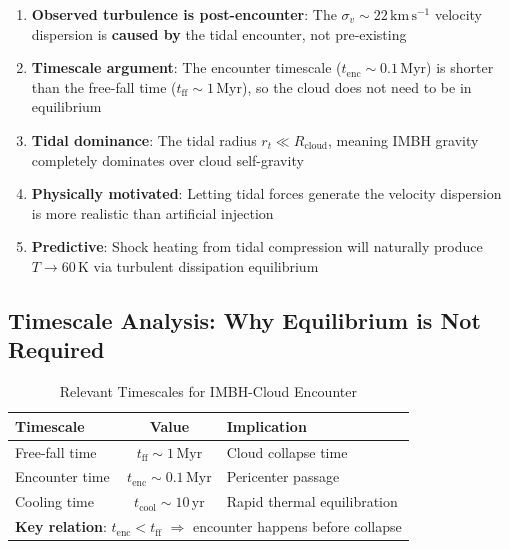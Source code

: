 \documentclass[11pt,a4paper]{article}
\newcommand{\kms}{\,\mathrm{km\,s^{-1}}}
\begin{document}
\begin{enumerate}
    \item \textbf{Observed turbulence is post-encounter}: The $\sigma_v \sim 22\kms$
          velocity dispersion is \textbf{caused by} the tidal encounter, not pre-existing

    \item \textbf{Timescale argument}: The encounter timescale ($t_\mathrm{enc} \sim 0.1\,\mathrm{Myr}$)
          is shorter than the free-fall time ($t_\mathrm{ff} \sim 1\,\mathrm{Myr}$),
          so the cloud does not need to be in equilibrium

    \item \textbf{Tidal dominance}: The tidal radius $r_t \ll R_\mathrm{cloud}$,
          meaning IMBH gravity completely dominates over cloud self-gravity

    \item \textbf{Physically motivated}: Letting tidal forces generate the velocity
          dispersion is more realistic than artificial injection

    \item \textbf{Predictive}: Shock heating from tidal compression will naturally
          produce $T \to 60\,\mathrm{K}$ via turbulent dissipation equilibrium
\end{enumerate}

\subsection{Timescale Analysis: Why Equilibrium is Not Required}

\begin{table}[h]
\centering
\caption{Relevant Timescales for IMBH-Cloud Encounter}
\begin{tabular}{lcl}
\toprule
\textbf{Timescale} & \textbf{Value} & \textbf{Implication} \\
\midrule
Free-fall time & $t_\mathrm{ff} \sim 1\,\mathrm{Myr}$ & Cloud collapse time \\
Encounter time & $t_\mathrm{enc} \sim 0.1\,\mathrm{Myr}$ & Pericenter passage \\
Cooling time & $t_\mathrm{cool} \sim 10\,\mathrm{yr}$ & Rapid thermal equilibration \\
\midrule
\multicolumn{3}{l}{\textbf{Key relation}: $t_\mathrm{enc} < t_\mathrm{ff}$ $\Rightarrow$ encounter happens before collapse} \\
\bottomrule
\end{tabular}
\end{table}
\end{document}

